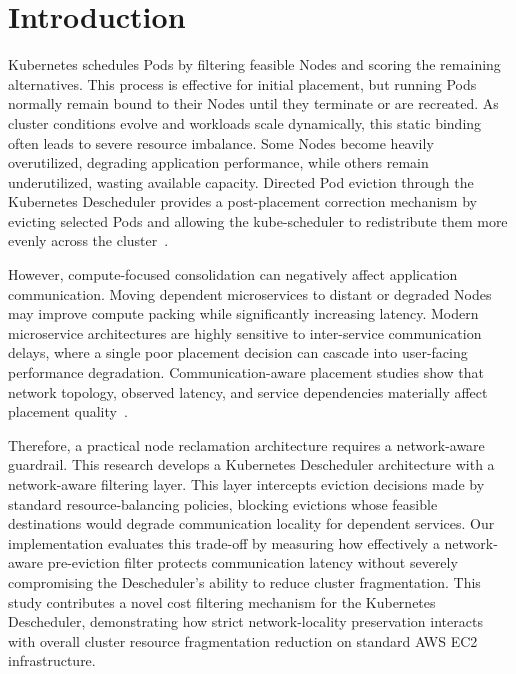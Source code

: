\section{Introduction}
\label{bab:1}

Kubernetes schedules Pods by filtering feasible Nodes and scoring the remaining alternatives. This process is effective for initial placement, but running Pods normally remain bound to their Nodes until they terminate or are recreated. As cluster conditions evolve and workloads scale dynamically, this static binding often leads to severe resource imbalance. Some Nodes become heavily overutilized, degrading application performance, while others remain underutilized, wasting available capacity. Directed Pod eviction through the Kubernetes Descheduler provides a post-placement correction mechanism by evicting selected Pods and allowing the kube-scheduler to redistribute them more evenly across the cluster~\cite{k8s_descheduler_docs,larsson_klein_elmroth_2023}.

However, compute-focused consolidation can negatively affect application communication. Moving dependent microservices to distant or degraded Nodes may improve compute packing while significantly increasing latency. Modern microservice architectures are highly sensitive to inter-service communication delays, where a single poor placement decision can cascade into user-facing performance degradation. Communication-aware placement studies show that network topology, observed latency, and service dependencies materially affect placement quality~\cite{marchese2022network,marchese_tomarchio_2022,chen2024trade}. 

Therefore, a practical node reclamation architecture requires a network-aware guardrail. This research develops a Kubernetes Descheduler architecture with a network-aware filtering layer. This layer intercepts eviction decisions made by standard resource-balancing policies, blocking evictions whose feasible destinations would degrade communication locality for dependent services. Our implementation evaluates this trade-off by measuring how effectively a network-aware pre-eviction filter protects communication latency without severely compromising the Descheduler's ability to reduce cluster fragmentation. This study contributes a novel cost filtering mechanism for the Kubernetes Descheduler, demonstrating how strict network-locality preservation interacts with overall cluster resource fragmentation reduction on standard AWS EC2 infrastructure.
